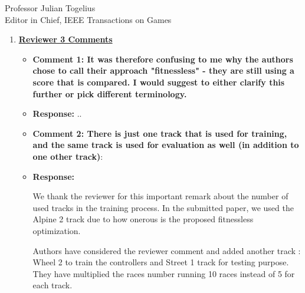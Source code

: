 \documentclass[10pt]{letter} %
\begin{document}
\begin{letter}{Professor Julian Togelius \\ Editor in Chief, IEEE Transactions on Games}
\begin{enumerate}
\begin{itemize}
		{\em Thus, in this paper we are testing the best approaches we have found all together in an algorithm, considering a kind of fitnessless selection, which we have called \textit{Grand Prix Selection} (GPS). Although this selection uses a score that could be assimilated to a fitness, it's actually an extension of a 	tournament selection policy since it creates tournaments of several individuals, and ``scores'' them according to how they fare in these races. This is not actually a fitness, since it's not intrinsic to
		the individual. It's equivalent to, in a $n$-tournament selection that is repeated several times, giving a score of $n$ to the first, $n-1$ to the second, and then using this for selection. That score is, thus, not a fitness but actually a way of keeping track of the position of the individual in the different tournaments it's participated; since, in this context, we have no way of evaluating (=assigning a fitness) to a controller but only a way to compare	them, we call this approach {\em fitnessless}, as it was called, for instance, in {\sc jaskowski2008winning}.}
		
		\item {\bf  Comment 2: Language errors :} 
			\item {\bf Response:} Revisited
	                \end{itemize}
\item {\bf \underline{ Reviewer 3 Comments}}\\
	\begin{itemize}
	\item {\bf  Comment 1: It was therefore confusing to me why the authors chose to call their approach "fitnessless" - they are still using a score that is compared. I would suggest to either clarify this further or pick different terminology.}\\
	\item {\bf Response:}
..
		\item {\bf  Comment 2:	There is just one track that is used for training, and the same track is used for evaluation as well (in addition to one other track)}:\\
		\item {\bf Response:}
				
		We thank the reviewer for this important remark about the number of used tracks in the training process. In the submitted paper, we used the Alpine 2 track due to how onerous is  the proposed fitnessless optimization. 
		
		Authors have considered the reviewer comment and added another track : Wheel 2 to train the controllers and Street 1 track for testing purpose.\\
		They have multiplied the races number running 10 races instead of 5 for each track.


\end{itemize}
\end{enumerate}
\end{letter}
\end{document}
